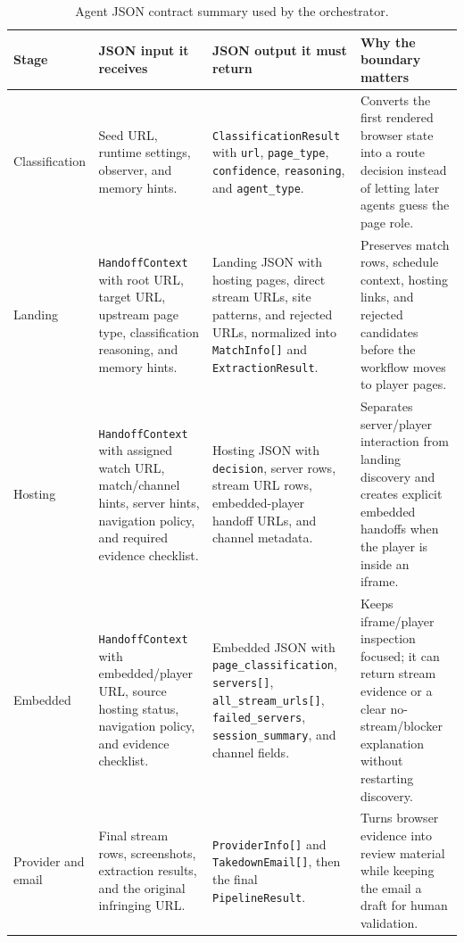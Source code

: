 \begin{table}[H]
\centering
\footnotesize
\begin{tabularx}{\textwidth}{Q{2.45cm} Y Y Y}
\toprule
{}
Stage & JSON input it receives & JSON output it must return & Why the boundary matters \\
\midrule
Classification & Seed URL, runtime settings, observer, and memory hints. &
\texttt{ClassificationResult} with \texttt{url}, \texttt{page\_type},
\texttt{confidence}, \texttt{reasoning}, and \texttt{agent\_type}. & Converts the
first rendered browser state into a route decision instead of letting later
agents guess the page role. \\
Landing & \texttt{HandoffContext} with root URL, target URL, upstream page type,
classification reasoning, and memory hints. & Landing JSON with hosting pages,
direct stream URLs, site patterns, and rejected URLs, normalized into
\texttt{MatchInfo[]} and \texttt{ExtractionResult}. & Preserves match rows,
schedule context, hosting links, and rejected candidates before the workflow
moves to player pages. \\
Hosting & \texttt{HandoffContext} with assigned watch URL, match/channel hints,
server hints, navigation policy, and required evidence checklist. & Hosting JSON
with \texttt{decision}, server rows, stream URL rows, embedded-player handoff
URLs, and channel metadata. & Separates server/player interaction from landing
discovery and creates explicit embedded handoffs when the player is inside an
iframe. \\
Embedded & \texttt{HandoffContext} with embedded/player URL, source hosting
status, navigation policy, and evidence checklist. & Embedded JSON with
\texttt{page\_classification}, \texttt{servers[]}, \texttt{all\_stream\_urls[]},
\texttt{failed\_servers}, \texttt{session\_summary}, and channel fields. & Keeps
iframe/player inspection focused; it can return stream evidence or a clear
no-stream/blocker explanation without restarting discovery. \\
Provider and email & Final stream rows, screenshots, extraction results, and the
original infringing URL. & \texttt{ProviderInfo[]} and \texttt{TakedownEmail[]},
then the final \texttt{PipelineResult}. & Turns browser evidence into review
material while keeping the email a draft for human validation. \\
\bottomrule
\end{tabularx}
\caption{Agent JSON contract summary used by the orchestrator.}\label{tab:agent-json-contract-summary}
\end{table}

